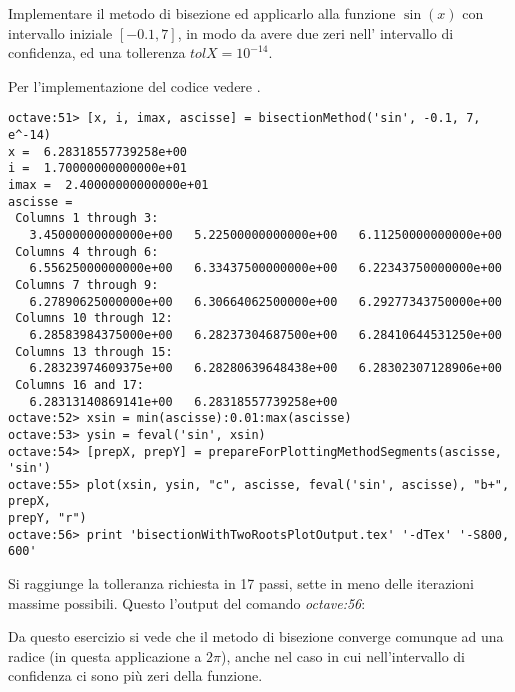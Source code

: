 \begin{exercise}
Implementare il metodo di bisezione ed applicarlo alla funzione $\sin(x)$ 
con intervallo iniziale $[-0.1, 7]$, in modo da avere due zeri nell'
intervallo di confidenza, ed una tollerenza $tolX = 10^{-14}$.
\end{exercise}
Per l'implementazione del codice vedere .
\begin{lstlisting}
octave:51> [x, i, imax, ascisse] = bisectionMethod('sin', -0.1, 7, e^-14)
x =  6.28318557739258e+00
i =  1.70000000000000e+01
imax =  2.40000000000000e+01
ascisse =
 Columns 1 through 3:
   3.45000000000000e+00   5.22500000000000e+00   6.11250000000000e+00
 Columns 4 through 6:
   6.55625000000000e+00   6.33437500000000e+00   6.22343750000000e+00
 Columns 7 through 9:
   6.27890625000000e+00   6.30664062500000e+00   6.29277343750000e+00
 Columns 10 through 12:
   6.28583984375000e+00   6.28237304687500e+00   6.28410644531250e+00
 Columns 13 through 15:
   6.28323974609375e+00   6.28280639648438e+00   6.28302307128906e+00
 Columns 16 and 17:
   6.28313140869141e+00   6.28318557739258e+00
octave:52> xsin = min(ascisse):0.01:max(ascisse)
octave:53> ysin = feval('sin', xsin)
octave:54> [prepX, prepY] = prepareForPlottingMethodSegments(ascisse, 'sin')
octave:55> plot(xsin, ysin, "c", ascisse, feval('sin', ascisse), "b+", prepX,
prepY, "r") 
octave:56> print 'bisectionWithTwoRootsPlotOutput.tex' '-dTex' '-S800, 600'
\end{lstlisting}
Si raggiunge la tolleranza richiesta in 17 passi, sette in meno delle iterazioni massime possibili. 
Questo l'output del comando \emph{octave:56}:
\begin{center}

\end{center}

Da questo esercizio si vede che il metodo di bisezione converge comunque
ad una radice (in questa applicazione a $2\pi$), anche nel caso in cui
nell'intervallo di confidenza ci sono pi\`u zeri della funzione.




